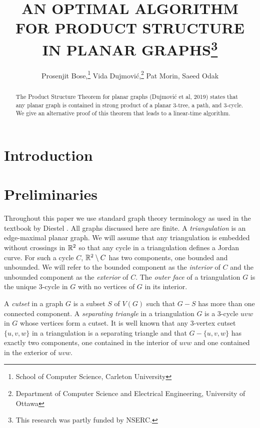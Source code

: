 \documentclass{patmorin}
\title{\MakeUppercase{An Optimal Algorithm for Product Structure in Planar Graphs}\thanks{This research was partly funded by NSERC.}}
\author{%
  Prosenjit Bose,\thanks{School of Computer Science, Carleton University}\qquad
  Vida Dujmović,\thanks{Department of Computer Science and Electrical Engineering, University of Ottawa}\qquad
  Pat Morin,\footnotemark[1]\qquad
  Saeed Odak\footnotemark[2]}
\date{}
\begin{document}
\maketitle

\begin{abstract}
    The Product Structure Theorem for planar graphs (Dujmović et al, 2019) states that any planar graph is contained in strong product of a planar $3$-tree, a path, and $3$-cycle.  We give an alternative proof of this theorem that leads to a linear-time algorithm.
\end{abstract}

%

\section{Introduction}

\section{Preliminaries}

Throughout this paper we use standard graph theory terminology as used in the textbook by Diestel \cite{diestel:graph}.  All graphs discussed here are finite.  A \emph{triangulation} is an edge-maximal planar graph.  We will assume that any triangulation is embedded without crossings in $\mathbb{R}^2$ so that any cycle in a triangulation defines a Jordan curve. For such a cycle $C$, $\mathbb{R}^2\setminus C$ has two components, one bounded and unbounded. We will refer to the bounded component as the \emph{interior} of $C$ and the unbounded component as the \emph{exterior} of $C$.  The \emph{outer face} of a triangulation $G$ is the unique $3$-cycle in $G$ with no vertices of $G$ in its interior.

A \emph{cutset} in a graph $G$ is a subset $S$ of $V(G)$ such that $G-S$ has more than one connected component.  A \emph{separating triangle} in a triangulation $G$ is a $3$-cycle $uvw$ in $G$ whose vertices form a cutset.  It is well known that any $3$-vertex cutset $\{u,v,w\}$ in a triangulation is a separating triangle and that $G-\{u,v,w\}$ has exactly two components, one contained in the interior of $uvw$ and one contained in the exterior of $uvw$.

\end{document}
